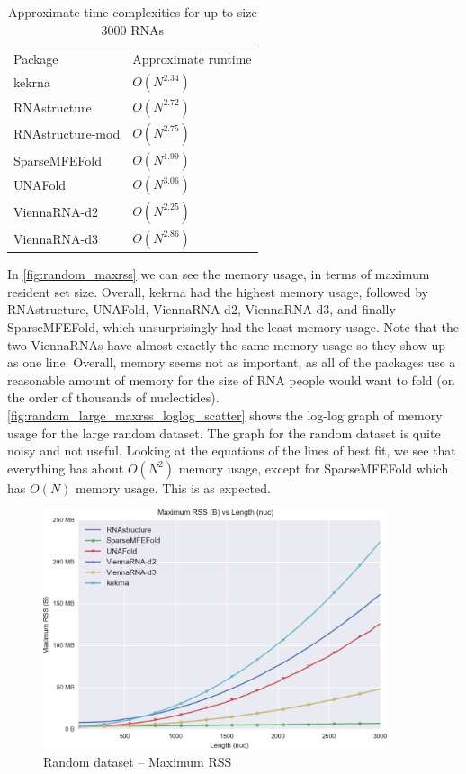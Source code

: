 \documentclass{cshonours}
\begin{document}
\begin{table}
\begin{adjustbox}{center}
\begin{tabular}{ll}
Package & Approximate runtime  \\
kekrna & $O(N^{2.34})$ \\
RNAstructure & $O(N^{2.72})$ \\
RNAstructure-mod & $O(N^{2.75})$ \\
SparseMFEFold & $O(N^{1.99})$ \\
UNAFold & $O(N^{3.06})$ \\
ViennaRNA-d2 & $O(N^{2.25})$ \\
ViennaRNA-d3 & $O(N^{2.86})$ \\
\end{tabular}
\end{adjustbox}
\caption{Approximate time complexities for up to size 3000 RNAs}
\label{table:random_complexity}
\end{table}

In \autoref{fig:random_maxrss} we can see the memory usage, in terms of maximum resident set size. Overall, kekrna had the highest memory usage, followed by RNAstructure, UNAFold, ViennaRNA-d2, ViennaRNA-d3, and finally SparseMFEFold, which unsurprisingly had the least memory usage. Note that the two ViennaRNAs have almost exactly the same memory usage so they show up as one line. Overall, memory seems not as important, as all of the packages use a reasonable amount of memory for the size of RNA people would want to fold (on the order of thousands of nucleotides). \autoref{fig:random_large_maxrss_loglog_scatter} shows the log-log graph of memory usage for the large random dataset. The graph for the random dataset is quite noisy and not useful. Looking at the equations of the lines of best fit, we see that everything has about $O(N^2)$ memory usage, except for SparseMFEFold which has $O(N)$ memory usage. This is as expected.

\begin{figure}[p]
\centering
\includegraphics[width=0.9\textwidth]{res/random_maxrss.png}
\caption{Random dataset -- Maximum RSS}
\label{fig:random_maxrss}
\end{figure}
\end{document}
